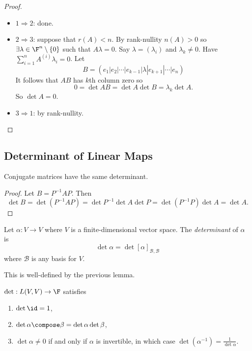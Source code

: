 \documentclass[a4paper]{article}
\newcommand*{\basis}{\mathcal}
\theoremstyle{definition}
\begin{document}
\begin{proof}\leavevmode
  \begin{itemize}
  \item \(1 \Rightarrow 2\): done.
  \item \(2 \Rightarrow 3\): suppose that \(r(A) < n\). By rank-nullity \(n(A) > 0\) so \(\exists \lambda \in \F^n \setminus \{0\}\) such that \(A \lambda = 0\). Say \(\lambda = (\lambda_i)\) and \(\lambda_k \neq 0\). Have \(\sum_{i = 1}^{n}A^{(i)}\lambda_i = 0 \). Let
    \[
      B= (e_1|e_2|\cdots|e_{k-1}|\lambda|e_{k+1}|\cdots|e_n)
    \]
    It follows that \(AB\) has \(k\)th column zero so
    \[
      0 = \det AB = \det A \det B = \lambda_k \det A.
    \]
    So \(\det A = 0\).
  \item \(3 \Rightarrow 1\): by rank-nullity.
  \end{itemize}
\end{proof}

\subsection{Determinant of Linear Maps}

\begin{lemma}
  Conjugate matrices have the same determinant.
\end{lemma}

\begin{proof}
  Let \(B = P^{-1}AP\). Then
  \[
    \det B = \det (P^{-1}AP) = \det P^{-1} \det A \det P = \det (P^{-1}P) \det A = \det A.
  \]
\end{proof}

\begin{definition}[Determinant]
  Let \(\alpha: V \to V\) where \(V\) is a finite-dimensional vector space. The \emph{determinant} of \(\alpha\) is
  \[
    \det \alpha = \det [\alpha]_{\basis B, \basis B}
  \]
  where \(\basis B\) is any basis for \(V\). 
\end{definition}
This is well-defined by the previous lemma.

\begin{theorem}
  \(\det: L(V, V) \to \F\) satisfies
  \begin{enumerate}
  \item \(\det \id = 1\),
  \item \(\det \alpha \compose \beta = \det \alpha \det \beta\),
  \item \(\det \alpha \neq 0\) if and only if \(\alpha\) is invertible, in which case \(\det (\alpha^{-1}) = \frac{1}{\det \alpha}\).
  \end{enumerate}
\end{theorem}
\end{document}
